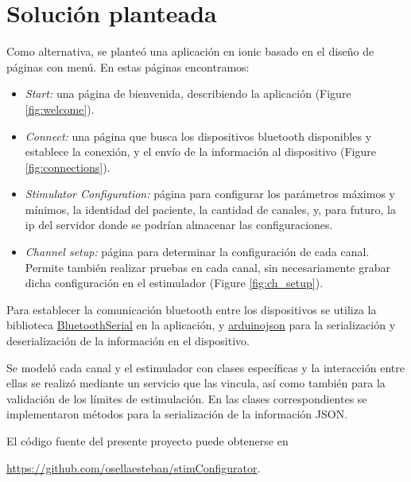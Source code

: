 \section{Solución planteada}
Como alternativa, se planteó una aplicación en ionic basado en el diseño de páginas con menú. En estas páginas encontramos:
\begin{itemize}
	\item \textit{Start:} una página de bienvenida, describiendo la aplicación (Figure \ref{fig:welcome}).
	\item \textit{Connect:} una página que busca los dispositivos bluetooth disponibles y establece la conexión, y el envío de la información al dispositivo (Figure \ref{fig:connections}).
	\item \textit{Stimulator Configuration:} página para configurar los parámetros máximos y mínimos, la identidad del paciente, la cantidad de canales, y, para futuro, la ip del servidor donde se podrían almacenar las configuraciones. 
	\item \textit{Channel setup:} página para determinar la configuración de cada canal. Permite también realizar pruebas en cada canal, sin necesariamente grabar dicha configuración en el estimulador (Figure \ref{fig:ch_setup}).
\end{itemize}
Para establecer la comunicación bluetooth entre los dispositivos se utiliza la biblioteca \href{https://ionicframework.com/docs/native/bluetooth-serial}{BluetoothSerial} en la aplicación, y \href{https://arduinojson.org/}{arduinojson} para la serialización y deserialización de la información en el dispositivo.

Se modeló cada canal y el estimulador con clases específicas y la interacción entre ellas se realizó mediante un servicio que las vincula, así como también para la validación de los límites de estimulación. En las clases correspondientes se implementaron métodos para la serialización de la información {JSON}. 

El código fuente del presente proyecto puede obtenerse en 

\href{https://github.com/osellaesteban/stimConfigurator}{https://github.com/osellaesteban/stimConfigurator}.

